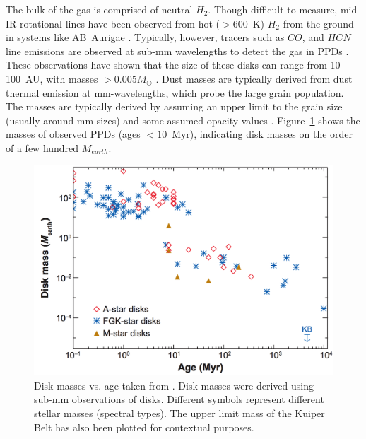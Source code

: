     The bulk of the gas is comprised of neutral $H_2$. Though difficult to measure, mid-IR rotational lines have been observed from hot ($>600$~K) $H_2$ from the ground in systems like AB~Aurigae \citep{Bitner2007}. Typically, however, tracers such as $CO$, and $HCN$ line emissions are observed at sub-mm wavelengths to detect the gas in PPDs \citep[e.g., for stars in young associations such as Ophiuchus and Taurus-Auriga,][respectively]{Andre1994,Beckwith1990}. These observations have shown that the size of these disks can range from 10--100~AU, with masses $>0.005M_\odot$ \citep{Osterloh1995}. Dust masses are typically derived from dust thermal emission at mm-wavelengths, which probe the large grain population. The masses are typically derived by assuming an upper limit to the grain size (usually around mm sizes) and some assumed opacity values \citep{Beckwith1990}. Figure~\ref{fig:disk_masses} shows the masses of observed PPDs (ages $<10$~Myr), indicating disk masses on the order of a few hundred $M_{earth}$. 
    
    \begin{figure}
    \centering
    \includegraphics[width=.8\textwidth]{Ch1/diskmass_age_wyatt2008} 
    \caption[Protoplanetary and Debris Disk Masses Over Time]{Disk masses vs. age taken from \citet{Wyatt2008}. Disk masses were derived using sub-mm observations of disks. Different symbols represent different stellar masses (spectral types). The upper limit mass of the Kuiper Belt has also been plotted for contextual purposes.}
    \label{fig:disk_masses}
    \end{figure}
    
